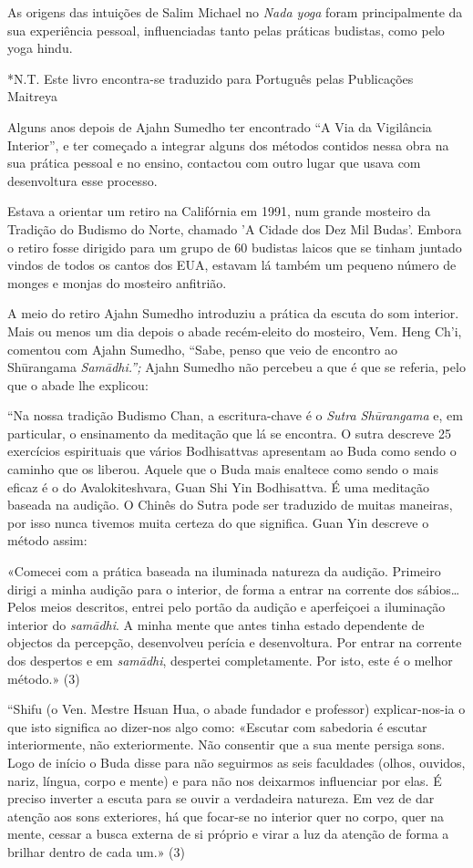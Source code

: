 As origens das intuições de Salim Michael no \emph{Nada yoga} foram
principalmente da sua experiência pessoal, influenciadas tanto pelas
práticas budistas, como pelo yoga hindu.

*N.T. Este livro encontra-se traduzido para Português pelas Publicações
Maitreya

Alguns anos depois de Ajahn Sumedho ter encontrado ``A Via da Vigilância
Interior'', e ter começado a integrar alguns dos métodos contidos nessa
obra na sua prática pessoal e no ensino, contactou com outro lugar que
usava com desenvoltura esse processo.

Estava a orientar um retiro na Califórnia em 1991, num grande mosteiro
da Tradição do Budismo do Norte, chamado 'A Cidade dos Dez Mil Budas'.
Embora o retiro fosse dirigido para um grupo de 60 budistas laicos que
se tinham juntado vindos de todos os cantos dos EUA, estavam lá também
um pequeno número de monges e monjas do mosteiro anfitrião.

A meio do retiro Ajahn Sumedho introduziu a prática da escuta do som
interior. Mais ou menos um dia depois o abade recém-eleito do mosteiro,
Vem. Heng Ch'i, comentou com Ajahn Sumedho, ``Sabe, penso que veio de
encontro ao Shūrangama \emph{Samādhi.'';} Ajahn Sumedho não percebeu a
que é que se referia, pelo que o abade lhe explicou:

``Na nossa tradição Budismo Chan, a escritura-chave é o \emph{Sutra
Shūrangama} e, em particular, o ensinamento da meditação que lá se
encontra. O sutra descreve 25 exercícios espirituais que vários
Bodhisattvas apresentam ao Buda como sendo o caminho que os liberou.
Aquele que o Buda mais enaltece como sendo o mais eficaz é o do
Avalokiteshvara, Guan Shi Yin Bodhisattva. É uma meditação baseada na
audição. O Chinês do Sutra pode ser traduzido de muitas maneiras, por
isso nunca tivemos muita certeza do que significa. Guan Yin descreve o
método assim:

«Comecei com a prática baseada na iluminada natureza da audição.
Primeiro dirigi a minha audição para o interior, de forma a entrar na
corrente dos sábios\ldots{} Pelos meios descritos, entrei pelo portão da
audição e aperfeiçoei a iluminação interior do \emph{samādhi}. A minha
mente que antes tinha estado dependente de objectos da percepção,
desenvolveu perícia e desenvoltura. Por entrar na corrente dos despertos
e em \emph{samādhi}, despertei completamente. Por isto, este é o melhor
método.» (3)

``Shifu (o Ven. Mestre Hsuan Hua, o abade fundador e professor)
explicar-nos-ia o que isto significa ao dizer-nos algo como: «Escutar
com sabedoria é escutar interiormente, não exteriormente. Não consentir
que a sua mente persiga sons. Logo de início o Buda disse para não
seguirmos as seis faculdades (olhos, ouvidos, nariz, língua, corpo e
mente) e para não nos deixarmos influenciar por elas. É preciso inverter
a escuta para se ouvir a verdadeira natureza. Em vez de dar atenção aos
sons exteriores, há que focar-se no interior quer no corpo, quer na
mente, cessar a busca externa de si próprio e virar a luz da atenção de
forma a brilhar dentro de cada um.» (3)

